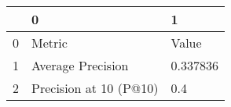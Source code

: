 \begin{tabular}{lll}
\toprule
{} &                       0 &         1 \\
\midrule
0 &                  Metric &     Value \\
1 &       Average Precision &  0.337836 \\
2 &  Precision at 10 (P@10) &       0.4 \\
\bottomrule
\end{tabular}
